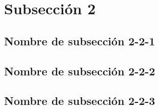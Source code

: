 \section{Subsección 2}
\lipsum[100] 

\subsection{Nombre de subsección 2-2-1}
\lipsum[17] 

\subsection{Nombre de subsección 2-2-2}
\lipsum[10]
\lipsum[100]

\subsection{Nombre de subsección 2-2-3}
\lipsum[100]
   
   